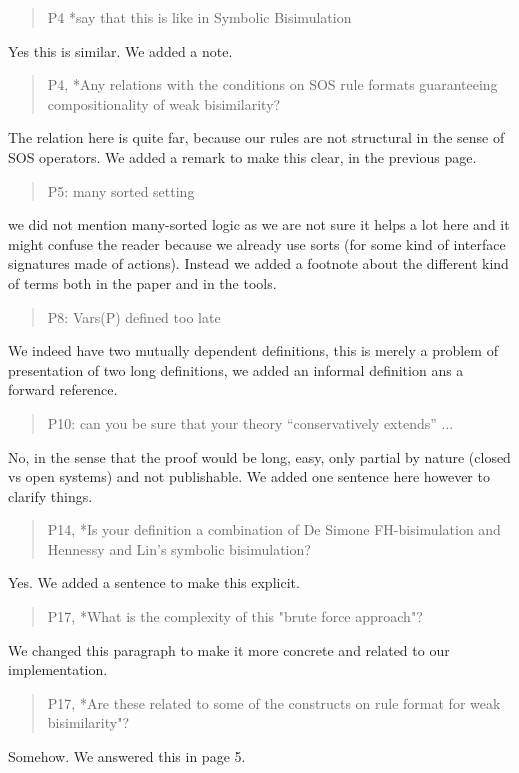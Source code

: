 \documentclass[10pt]{article}
\newenvironment{review}{\bgroup\itshape\begin{quote}}{\end{quote}\egroup}
\begin{document}
\begin{review}
P4 *say that this is like in Symbolic Bisimulation
\end{review}
Yes this is similar. We added a note.

\begin{review}
P4, *Any relations with the conditions on SOS rule formats guaranteeing compositionality of weak bisimilarity?
\end{review}
 The relation here is quite far, because our rules are not structural in the sense of SOS operators. We added a remark to make this clear, in the previous page.

\begin{review}
P5: many sorted setting 
\end{review}
we did not mention many-sorted logic as we are not sure it helps a lot here and it might confuse the reader because we already use sorts (for some kind of interface signatures made of actions). Instead we added a footnote about the different kind of terms both in the paper and in the tools.

\begin{review}
P8: Vars(P) defined too late
\end{review}
We indeed have two mutually dependent definitions, this is merely a problem of presentation of two long definitions, we added an informal definition ans a forward reference.

\begin{review}
P10: can you be sure that your theory ``conservatively extends'' ...
\end{review}
No, in the sense that the proof would be long, easy, only partial by nature (closed vs open systems) and not publishable. We added one sentence here however to clarify things.

\begin{review}
P14, *Is your definition a combination of De Simone FH-bisimulation and Hennessy and Lin's symbolic bisimulation?
\end{review}
Yes. We added a sentence to make this explicit.


\begin{review}
{P17, *What is the complexity of this "brute force approach"?}
\end{review}
We changed this paragraph to make it more concrete and related to our implementation.

\begin{review}
{P17, *Are these related to some of the constructs on rule format for weak bisimilarity"?}
\end{review}
Somehow. We answered this in page 5.
\end{document}
